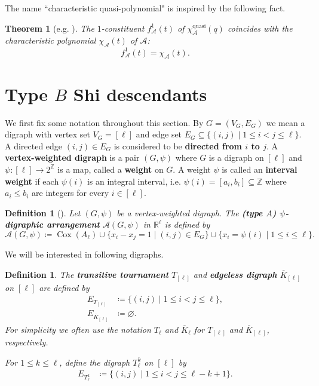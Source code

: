 \documentclass[11pt]{article}
\newtheorem{definition}[theo]{Definition}
\newtheorem{theorem}[theo]{Theorem}
\theoremstyle{definition}
\numberwithin{equation}{section}
\DeclareMathOperator{\Cox}{Cox}
\newcommand{\A}{\mathcal{A}}
\newcommand{\tbf}{\textbf}
\newcommand{\quasi}{\operatorname{quasi}}
\begin{document}
The name ``characteristic quasi-polynomial" is inspired by the following fact.


\begin{theorem}[{e.g. \cite[Remark 3.3]{KTT11}}]
\label{thm:KTT11} 
The $1$-constituent $f^1_{\A}(t)$ of $\chi^{\quasi}_{\A}(q)$ coincides with the characteristic polynomial $\chi_\A( t)$ of $\A$: 	
$$f^1_{\A}(t)=\chi_{\A}(t).$$
\end{theorem}




\section{Type \texorpdfstring{$B$}{B} Shi descendants}
\label{sec:F-SS-BSI}
\quad
We first fix some notation throughout this section. 
By $ G = (V_{G}, E_{G}) $ we mean a digraph  with vertex set $ V_{G} = [\ell]$ and edge set $E_G \subseteq \{(i,j) \mid 1 \leq i < j \leq \ell\}$. 
A directed edge $(i,j) \in E_{G}$ is considered to be \tbf{directed from $i$ to $j$}.
A  \tbf{vertex-weighted digraph} is a pair  $(G,\psi)$ where $G$ is a digraph on $ [\ell]$ and $ \psi \colon [\ell] \to 2^{\mathbb{Z}} $ is a map, called a \tbf{weight} on $G$. 
A weight   $ \psi$ is called an \tbf{interval weight} if each $\psi(i)$  is an integral interval, i.e. $ \psi(i) = [a_{i}, b_{i}]\subseteq \mathbb{Z}$ where $a_{i}\le b_{i}$ are integers for every $ i \in [\ell] $. 


\begin{definition}[{\cite[Definition 2.1]{ATT24}}]
\label{def:A-psi-digraphic}
Let $(G,\psi)$ be a vertex-weighted digraph.
The \tbf{(type $A$) $ \psi $-digraphic arrangement} $ \A(G,\psi) $ in $ \mathbb{R}^{\ell} $ is defined by 
$$
\A(G,\psi)  \coloneqq 
\Cox(A_\ell) 
\cup \{ x_{i}-x_{j}=1  \mid (i,j) \in E_{G}\}
\cup \{  x_{i}=\psi(i) \mid 1 \leq i   \leq \ell\}.
$$
\end{definition}

We will be interested in following digraphs.
\begin{definition}
\label{def:digraphs}
The \tbf{transitive tournament} $  T_{[\ell]}$ and \tbf{edgeless digraph} $ \overline{K}_{[\ell]}$ on $ [\ell]$ are defined by 
\begin{align*}
E_{T_{[\ell]}} & \coloneqq  \{(i,j) \mid 1 \leq i < j \leq \ell\},\\
E_{\overline{K}_{[\ell]}} & \coloneqq  \varnothing.
\end{align*}
For simplicity we often use the notation $T_{\ell}$ and $ \overline{K}_{\ell}$ for $  T_{[\ell]} $ and $ \overline{K}_{[\ell]}$, respectively. 

For $1 \leq   k \leq \ell$, define the digraph  $ T_{\ell}^{k}$  on $ [\ell] $ by 
\begin{align*} 
E_{T_{\ell}^{k}} &  \coloneqq \{(i,j) \mid 1 \leq i < j \leq \ell - k + 1\}.
\end{align*}
\end{definition}
\end{document}
